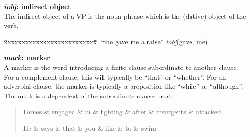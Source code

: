 \documentclass[11pt,letterpaper]{article}
\begin{document}
\noindent\textbf{\emph{iobj}: indirect object}\\
The indirect object of a VP is the noun phrase which is the (dative) object of the verb.
\begin{tabbing}
\hspace{1cm} \= xxxxxxxxxxxxxxxxxxxxxxxxxx\= \hspace{.5cm}\=  \kill
 \> ``She gave me a raise'' \> \> \emph{iobj}(gave, me)\\
\end{tabbing}

\noindent\textbf{\emph{mark}: marker}\\
A marker is the word introducing a finite clause subordinate to another clause.
For a complement clause, this will typically be ``that'' or ``whether''.
For an adverbial clause, the marker is typically a preposition like ``while'' or ``although''.
The mark is a dependent of the subordinate clause head.
\begin{quote}
\begin{dependency}
   \begin{deptext}[column sep=0.2em]
      Forces \& engaged \& in \& fighting \& after \& insurgents \&  attacked
\\
   \end{deptext}
\end{dependency}

\begin{dependency}
   \begin{deptext}[column sep=0.2em]
      He \& says \& that \& you \& like \& to \& swim
\\
   \end{deptext}
\end{dependency}
\end{quote}
\end{document}
